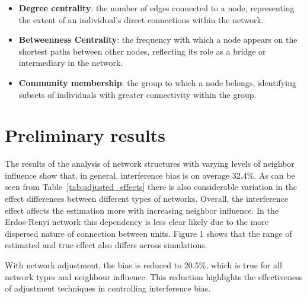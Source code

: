 \documentclass[a4paper,11pt]{article}
\begin{document}
\begin{itemize}
    \item \textbf{Degree centrality}: the number of edges connected to a node, representing the extent of an individual's direct connections within the network.
    \item \textbf{Betweenness Centrality}: the frequency with which a node appears on the shortest paths between other nodes, reflecting its role as a bridge or intermediary in the network.
    \item \textbf{Community membership}: the group to which a node belongs, identifying subsets of individuals with greater connectivity within the group.
\end{itemize}

\section{Preliminary results}
The results of the analysis of network structures with varying levels of neighbor influence show that, in general, interference bias is on average 32.4\%. As can be seen from Table~\ref{tab:adjusted_effects} there is also considerable variation in the effect differences between different types of networks. Overall, the interference effect affects the estimation more with increasing neighbor influence. In the Erdos-Renyi network this dependency is less clear likely due to the more dispersed nature of connection between units. Figure 1 shows that the range of estimated and true effect also differs across simulations.

With network adjustment, the bias is reduced to 20.5\%, which is true for all network types and neighbour influence. This reduction highlights the effectiveness of adjustment techniques in controlling interference bias.
\end{document}
